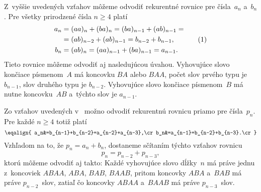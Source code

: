 {\poznamka
Z~vyššie uvedených vzťahov môžeme odvodiť
rekurentné rovnice pre čísla~$a_n$ a~$b_n$. Pre všetky prirodzené
čísla $n\geq4$ platí
$$
\aligned
a_n&=(aa)_n+(ba)_n=(ba)_{n-1}+(ab)_{n-1}=\\
   &=(ab)_{n-2}+(ab)_{n-1}=b_{n-2}+b_{n-1},\cr
b_n&=(ab)_n=(aa)_{n-1}+(ba)_{n-1}=a_{n-1}.
\endaligned
\tag1
$$
Tieto rovnice môžeme odvodiť aj nasledujúcou úvahou. Vyhovujúce
slovo končiace písmenom~$A$ má koncovku $BA$ alebo $BAA$, počet
slov prvého typu je $b_{n-1}$, slov druhého typu je $b_{n-2}$.
Vyhovujúce slovo končiace písmenom~$B$ má nutne koncovku~$AB$
a~týchto slov je $a_{n-1}$.

Zo vzťahov uvedených v~ možno odvodiť
rekurentnú rovnicu priamo pre čísla~$p_n$. Pre každé $n\geq4$ totiž platí
$$
\eqalign{
a_n&=b_{n-1}+b_{n-2}=a_{n-2}+a_{n-3},\cr
 b_n&=a_{n-1}=b_{n-2}+b_{n-3}.\cr}
$$
Vzhľadom na to, že $p_n=a_n+b_n$, dostaneme sčítaním týchto
vzťahov rovnicu
$$
p_n=p_{n-2}+p_{n-3},
$$
ktorú môžeme odvodiť aj takto: Každé vyhovujúce slovo dĺžky~$n$
má práve jednu z~koncoviek $ABAA$, $ABA$, $BAB$, $BAAB$, pritom
koncovky $ABA$ a~$BAB$ má práve $p_{n-2}$~slov, zatiaľ čo koncovky
$ABAA$ a~$BAAB$ má práve $p_{n-3}$~slov.}

